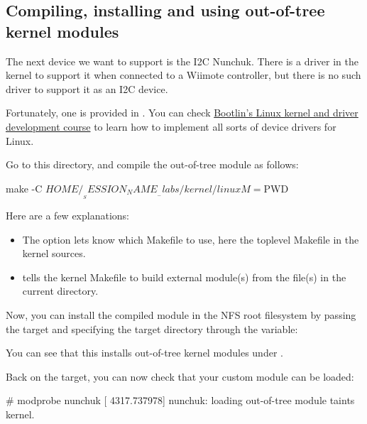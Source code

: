 {\subsection{Compiling, installing and using out-of-tree kernel modules}

The next device we want to support is the I2C Nunchuk. There is a driver
in the kernel to support it when connected to a Wiimote controller, but
there is no such driver to support it as an I2C device.

Fortunately, one is provided in
. You can check
\href{https://bootlin.com/training/kernel/}{Bootlin's Linux kernel and
driver development course} to learn how to implement all sorts of device
drivers for Linux.

Go to this directory, and compile the out-of-tree module as follows:

\begin{bashinput}
make -C $HOME/__SESSION_NAME__-labs/kernel/linux M=$PWD
\end{bashinput}

Here are a few explanations:
\begin{itemize}
\item The  option lets  know which Makefile to
      use, here the toplevel Makefile in the kernel sources.
\item {} tells the kernel Makefile to build external
      module(s) from the file(s) in the current directory.
\end{itemize}

Now, you can install the compiled module in the NFS root filesystem
by passing the  target and specifying the
target directory through the  variable:


You can see that this installs out-of-tree kernel modules under
.

Back on the target, you can now check that your custom module can
be loaded:

\begin{bashinput}
# modprobe nunchuk
[ 4317.737978] nunchuk: loading out-of-tree module taints kernel.
\end{bashinput}

}
